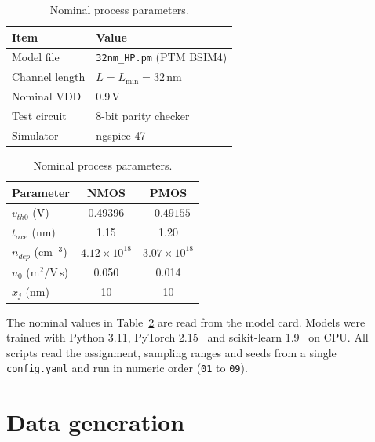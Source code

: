 \documentclass[11pt,a4paper]{article}
\begin{document}
\begin{table}[!htbp]
\centering
\begin{minipage}[t]{0.52\linewidth}
\centering
\caption{Assignment and simulator.}
\label{tab:setup}
\begin{tabular}{ll}
\toprule
Item & Value \\
\midrule
Model file      & \texttt{32nm\_HP.pm} (PTM BSIM4) \\
Channel length  & $L = L_{\min} = 32$\,nm \\
Nominal VDD     & 0.9\,V \\
Test circuit    & 8-bit parity checker \\
Simulator       & ngspice-47 \\
\bottomrule
\end{tabular}
\end{minipage}\hfill
\begin{minipage}[t]{0.46\linewidth}
\centering
\caption{Nominal process parameters.}
\label{tab:nominal}
\begin{tabular}{lcc}
\toprule
Parameter & NMOS & PMOS \\
\midrule
$v_{th0}$ (V)                  & 0.49396 & $-0.49155$ \\
$t_{oxe}$ (nm)                 & 1.15 & 1.20 \\
$n_{dep}$ (cm$^{-3}$)          & $4.12\times10^{18}$ & $3.07\times10^{18}$ \\
$u_0$ (m$^2$/V\,s)             & 0.050 & 0.014 \\
$x_j$ (nm)                     & 10 & 10 \\
\bottomrule
\end{tabular}
\end{minipage}
\end{table}

The nominal values in Table~\ref{tab:nominal} are read from the model card. Models were trained
with Python 3.11, PyTorch 2.15~\cite{pytorch} and scikit-learn 1.9~\cite{sklearn} on CPU. All scripts
read the assignment, sampling ranges and seeds from a single \texttt{config.yaml} and run in numeric
order (\texttt{01} to \texttt{09}).

\section{Data generation}
\end{document}

